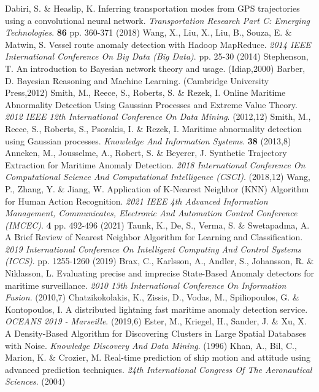 Dabiri, S. \& Heaslip, K. Inferring transportation modes from GPS trajectories using a convolutional neural network. {\em Transportation Research Part C: Emerging Technologies}. \textbf{86} pp. 360-371 (2018)
Wang, X., Liu, X., Liu, B., Souza, E. \& Matwin, S. Vessel route anomaly detection with Hadoop MapReduce. {\em 2014 IEEE International Conference On Big Data (Big Data)}. pp. 25-30 (2014)
Stephenson, T. An introduction to Bayesian network theory and usage. (Idiap,2000)
Barber, D. Bayesian Reasoning and Machine Learning. (Cambridge University Press,2012)
Smith, M., Reece, S., Roberts, S. \& Rezek, I. Online Maritime Abnormality Detection Using Gaussian Processes and Extreme Value Theory. {\em 2012 IEEE 12th International Conference On Data Mining}. (2012,12)
Smith, M., Reece, S., Roberts, S., Psorakis, I. \& Rezek, I. Maritime abnormality detection using Gaussian processes. {\em Knowledge And Information Systems}. \textbf{38} (2013,8)
Anneken, M., Jousselme, A., Robert, S. \& Beyerer, J. Synthetic Trajectory Extraction for Maritime Anomaly Detection. {\em 2018 International Conference On Computational Science And Computational Intelligence (CSCI)}. (2018,12)
Wang, P., Zhang, Y. \& Jiang, W. Application of K-Nearest Neighbor (KNN) Algorithm for Human Action Recognition. {\em 2021 IEEE 4th Advanced Information Management, Communicates, Electronic And Automation Control Conference (IMCEC)}. \textbf{4} pp. 492-496 (2021)
Taunk, K., De, S., Verma, S. \& Swetapadma, A. A Brief Review of Nearest Neighbor Algorithm for Learning and Classification. {\em 2019 International Conference On Intelligent Computing And Control Systems (ICCS)}. pp. 1255-1260 (2019)
Brax, C., Karlsson, A., Andler, S., Johansson, R. \& Niklasson, L. Evaluating precise and imprecise State-Based Anomaly detectors for maritime surveillance. {\em 2010 13th International Conference On Information Fusion}. (2010,7)
Chatzikokolakis, K., Zissis, D., Vodas, M., Spiliopoulos, G. \& Kontopoulos, I. A distributed lightning fast maritime anomaly detection service. {\em OCEANS 2019 - Marseille}. (2019,6)
Ester, M., Kriegel, H., Sander, J. \& Xu, X. A Density-Based Algorithm for Discovering Clusters in Large Spatial Databases with Noise. {\em Knowledge Discovery And Data Mining}. (1996)
Khan, A., Bil, C., Marion, K. \& Crozier, M. Real-time prediction of ship motion and attitude using advanced prediction techniques. {\em 24th International Congress Of The Aeronautical Sciences}. (2004)
